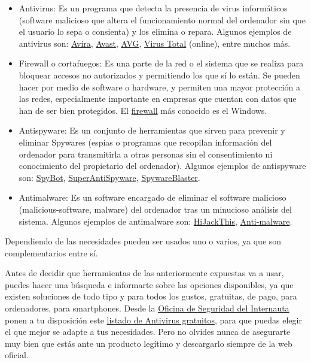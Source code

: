 \documentclass[
  spanish,
  a4paper,
  openany]{book}
\begin{document}
\begin{itemize}
\item
  Antivirus: Es un programa que detecta la presencia de virus informáticos (software malicioso que altera el funcionamiento normal del ordenador sin que el usuario lo sepa o consienta) y los elimina o repara. Algunos ejemplos de antivirus son: \href{https://www.avira.com/es}{Avira}, \href{https://www.avast.com/es-es/index\#pc}{Avast}, \href{https://www.avg.com/es-es/homepage\#pc}{AVG}, \href{https://www.virustotal.com/gui/}{Virus Total} (online), entre muchos más.
\item
  Firewall o cortafuegos: Es una parte de la red o el sistema que se realiza para bloquear accesos no autorizados y permitiendo los que sí lo están. Se pueden hacer por medio de software o hardware, y permiten una mayor protección a las redes, especialmente importante en empresas que cuentan con datos que han de ser bien protegidos. El \href{https://en.wikipedia.org/wiki/Windows_Firewall}{firewall} más conocido es el Windows.
\item
  Antispyware: Es un conjunto de herramientas que sirven para prevenir y eliminar Spywares (espías o programas que recopilan información del ordenador para transmitirla a otras personas sin el consentimiento ni conocimiento del propietario del ordenador). Algunos ejemplos de antispyware son: \href{https://www.safer-networking.org/}{SpyBot}, \href{https://www.superantispyware.com/}{SuperAntiSpyware}, \href{https://www.brightfort.com/spywareblaster.html}{SpywareBlaster}.
\item
  Antimalware: Es un software encargado de eliminar el software malicioso (malicious-software, malware) del ordenador tras un minucioso análisis del sistema. Algunos ejemplos de antimalware son: \href{https://www.infospyware.com/antimalware/hijackthis/}{HiJackThis}, \href{https://www.malwarebytes.com/}{Anti-malware}.
\end{itemize}

Dependiendo de las necesidades pueden ser usados uno o varios, ya que son complementarios entre sí.

Antes de decidir que herramientas de las anteriormente expuestas va a usar, puedes hacer una búsqueda e informarte sobre las opciones disponibles, ya que existen soluciones de todo tipo y para todos los gustos, gratuitas, de pago, para ordenadores, para smartphones. Desde la \href{https://www.osi.es}{Oficina de Seguridad del Internauta} ponen a tu disposición este \href{https://www.osi.es/es/herramientas-gratuitas?herramienta_selec\%5B0\%5D=115}{listado de Antivirus gratuitos}, para que puedas elegir el que mejor se adapte a tus necesidades. Pero no olvides nunca de asegurarte muy bien que estás ante un producto legítimo y descargarlo siempre de la web oficial.
\end{document}

